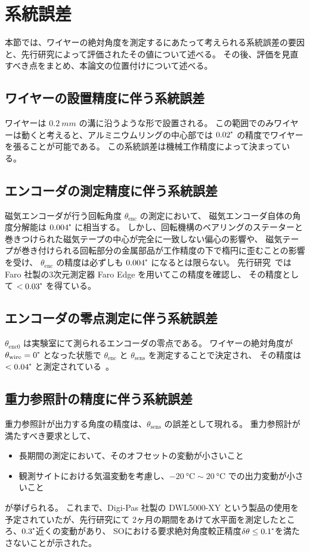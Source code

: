 \documentclass[../../main.tex]{subfiles}
\begin{document}
\section{系統誤差}
本節では、ワイヤーの絶対角度を測定するにあたって考えられる系統誤差の要因と、先行研究によって評価されたその値について述べる。
その後、評価を見直すべき点をまとめ、本論文の位置付けについて述べる。
\subsection{ワイヤーの設置精度に伴う系統誤差}
ワイヤーは $\SI{0.2}{mm}$ の溝に沿うような形で設置される。
この範囲でのみワイヤーは動くと考えると、アルミニウムリングの中心部では $0.02\tcdegree$ の精度でワイヤーを張ることが可能である。
この系統誤差は機械工作精度によって決まっている。
\subsection{エンコーダの測定精度に伴う系統誤差}
磁気エンコーダが行う回転角度 $\theta_{\mathrm{enc}}$ の測定において、
磁気エンコーダ自体の角度分解能は $0.004\tcdegree$ に相当する。
しかし、回転機構のベアリングのステーターと巻きつけられた磁気テープの中心が完全に一致しない偏心の影響や、
磁気テープが巻き付けられる回転部分の金属部品が工作精度の下で楕円に歪むことの影響を受け、
$\theta_{\mathrm{enc}}$ の精度は必ずしも $0.004\tcdegree$ になるとは限らない。
先行研究~\cite{swg:iijima}では Faro 社製の3次元測定器 Faro Edge を用いてこの精度を確認し、
その精度として $< 0.03\tcdegree$ を得ている。
\subsection{エンコーダの零点測定に伴う系統誤差}
$\theta_{\mathrm{enc}0}$ は実験室にて測られるエンコーダの零点である。
ワイヤーの絶対角度が $\theta_{\mathrm{wire}} = 0\tcdegree$ となった状態で $\theta_{\mathrm{enc}}$ と $\theta_{\mathrm{sens}}$ を測定することで決定され、
その精度は $< 0.04\tcdegree$ と測定されている~\cite{swg:iijima}。\\

\subsection{重力参照計の精度に伴う系統誤差}
重力参照計が出力する角度の精度は、$\theta_{\mathrm{sens}}$ の誤差として現れる。
重力参照計が満たすべき要求として、
\begin{itemize}
    \item 長期間の測定において、そのオフセットの変動が小さいこと
    \item 観測サイトにおける気温変動を考慮し、$\SI{-20}{\degreeCelsius}\sim\SI{20}{\degreeCelsius}$ での出力変動が小さいこと
\end{itemize}
が挙げられる。
これまで、Digi-Pas 社製の DWL5000-XY という製品の使用を予定されていたが、先行研究\cite{swg:iijima}にて
2ヶ月の期間をあけて水平面を測定したところ、$0.3\tcdegree$近くの変動があり、
SOにおける要求絶対角度較正精度$\delta\theta \leq 0.1\tcdegree$を満たさないことが示された。
\end{document}
